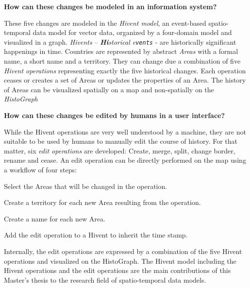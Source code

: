 \begin{description}[labelindent=0.1em]
  \item[\textbf{2a)}]
  \textbf{
    How can these changes be modeled in an information system?
  }
\end{description}

These five changes are modeled in the \emph{Hivent model}, an event-based spatio-temporal data model for vector data, organized by a four-domain model and visualized in a graph.
\emph{Hivents} -- \emph{\textbf{Hi}storical e\texttt{vents}} - are historically significant happenings in time.
Countries are represented by abstract \emph{Areas} with a formal name, a short name and a territory. They can change due a combination of five \emph{Hivent operations} representing exactly the five historical changes. Each operation ceases or creates a set of Areas or updates the properties of an Area.
The history of Areas can be visualized spatially on a map and non-spatially on the \emph{HistoGraph}

\begin{description}[labelindent=0.1em]
  \item[\textbf{2b)}]
  \textbf{
    How can these changes be edited by humans in a user interface?
  }
\end{description}

While the Hivent operations are very well understood by a machine, they are not suitable to be used by humans to manually edit the course of history. For that matter, six \emph{edit operations} are developed: Create, merge, split, change border, rename and cease. An edit operation can be directly performed on the map using a workflow of four steps:

\begin{compactenum}
  \item Select the Areas that will be changed in the operation.
  \item Create a territory for each new Area resulting from the operation.
  \item Create a name for each new Area.
  \item Add the edit operation to a Hivent to inherit the time stamp.
\end{compactenum}

Internally, the edit operations are expressed by a combination of the five Hivent operations and visualized on the HistoGraph. The Hivent model including the Hivent operations and the edit operations are the main contributions of this Master's thesis to the research field of spatio-temporal data models.

